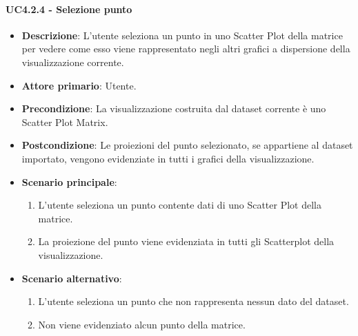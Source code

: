\paragraph{UC4.2.4 - Selezione punto}
\label{par:uc4.2.4}
\begin{itemize}
    \item \textbf{Descrizione}: L'utente seleziona un punto in uno Scatter Plot della matrice per vedere come
                                esso viene rappresentato negli altri grafici a dispersione della visualizzazione corrente.

    \item \textbf{Attore primario}: Utente.

    \item \textbf{Precondizione}:   La visualizzazione costruita dal dataset corrente è uno Scatter Plot Matrix.
    \item \textbf{Postcondizione}:  Le proiezioni del punto selezionato, se appartiene al dataset importato,
                                    vengono evidenziate in tutti i grafici della visualizzazione.

	\item \textbf{Scenario principale}:
        \begin{enumerate}
            \item L'utente seleziona un punto contente dati di uno Scatter Plot della matrice.
            \item La proiezione del punto viene evidenziata in tutti gli Scatterplot della visualizzazione.
        \end{enumerate}

    \item \textbf{Scenario alternativo}:
        \begin{enumerate}
            \item L'utente seleziona un punto che non rappresenta nessun dato del dataset.
            \item Non viene evidenziato alcun punto della matrice.
        \end{enumerate}

\end{itemize}


